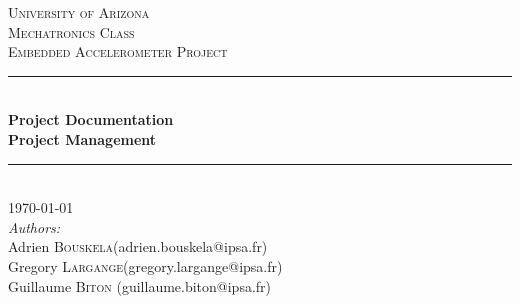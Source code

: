 \begin{titlepage}

\newcommand{\HRule}{\rule{\linewidth}{0.5mm}} %

\center %
 

\textsc{\LARGE University of Arizona}\\[1.5cm] %
\textsc{\Large Mechatronics Class}\\[0.5cm] %
\textsc{\large Embedded Accelerometer Project}\\[0.5cm] %


\HRule \\[0.4cm]
{ \huge \bfseries Project Documentation}\\[0.4cm] %
{ \Large \bfseries Project Management}\\[0.4cm] %
\HRule \\[1.5cm]


{\large \today}\\[1.5cm] %

 
\large\emph{Authors:}\\
Adrien \textsc{Bouskela}\small (adrien.bouskela@ipsa.fr)\\
Gregory \textsc{Largange}\small (gregory.largange@ipsa.fr)\\
Guillaume \textsc{Biton} \small (guillaume.biton@ipsa.fr)\\[1cm]


\end{titlepage}
